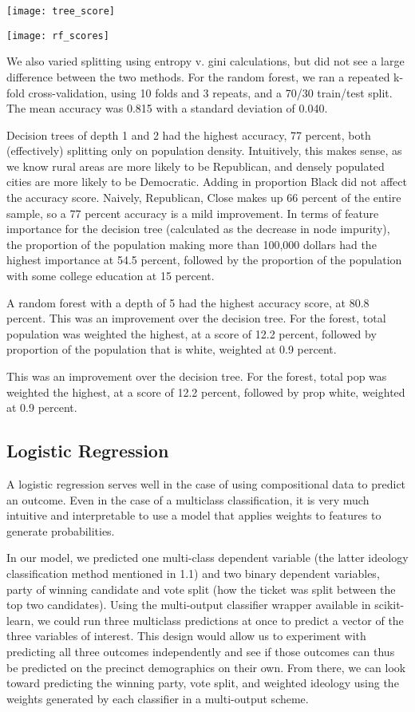 \documentclass{article}
\begin{document}
\begin{itemize}
\texttt{[image: tree\_score]}

\texttt{[image: rf\_scores]}

We also varied splitting using entropy v. gini calculations, but did not see a large difference between the two methods. For the random forest, we ran a repeated k-fold cross-validation, using 10 folds and 3 repeats, and a 70/30 train/test split. The mean accuracy was 0.815 with a standard deviation of 0.040.

Decision trees of depth 1 and 2 had the highest accuracy, 77 percent, both (effectively) splitting only on population density. Intuitively, this makes sense, as we know rural areas are more likely to be Republican, and densely populated cities are more likely to be Democratic. Adding in proportion Black did not affect the accuracy score. Naively, Republican, Close makes up 66 percent of the entire sample, so a 77 percent accuracy is a mild improvement. In terms of feature importance for the decision tree (calculated as the decrease in node impurity), the proportion of the population making more than 100,000 dollars had the highest importance at 54.5 percent, followed by the proportion of the population with some college education at 15 percent.

A random forest with a depth of 5 had the highest accuracy score, at 80.8 percent. This was an improvement over the decision tree. For the forest, total population was weighted the highest, at a score of 12.2 percent, followed by proportion of the population that is white, weighted at 0.9 percent.

This was an improvement over the decision tree. For the forest, total pop was 
weighted the highest, at a score of 12.2 percent, followed by prop white, 
weighted at 0.9 percent. 



\subsection{Logistic Regression}

A logistic regression serves well in the case of using compositional data to predict an outcome. Even in the case of a multiclass classification, it is very much intuitive and interpretable to use a model that applies weights to features to generate probabilities.

In our model, we predicted one multi-class dependent variable (the latter ideology classification method mentioned in 1.1) and two binary dependent variables, party of winning candidate and vote split (how the ticket was split between the top two candidates). Using the multi-output classifier wrapper available in scikit-learn, we could run three multiclass predictions at once to predict a vector of the three variables of interest. This design would allow us to experiment with predicting all three outcomes independently and see if those outcomes can thus be predicted on the precinct demographics on their own. From there, we can look toward predicting the winning party, vote split, and weighted ideology using the weights generated by each classifier in a multi-output scheme.


\end{itemize}
\end{document}
